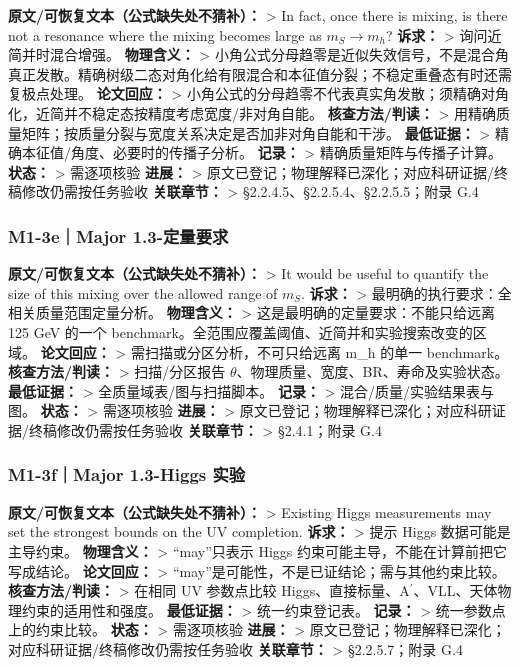 \documentclass[
  chinese,
  UTF8]{ctexart}
\begin{document}
\textbf{原文/可恢复文本（公式缺失处不猜补）：} \textgreater{} In fact,
once there is mixing, is there not a resonance where the mixing becomes
large as \(m_S\to m_h\)? \textbf{诉求：} \textgreater{}
询问近简并时混合增强。 \textbf{物理含义：} \textgreater{}
小角公式分母趋零是近似失效信号，不是混合角真正发散。精确树级二态对角化给有限混合和本征值分裂；不稳定重叠态有时还需复极点处理。
\textbf{论文回应：} \textgreater{}
小角公式的分母趋零不代表真实角发散；须精确对角化，近简并不稳定态按精度考虑宽度/非对角自能。
\textbf{核查方法/判读：} \textgreater{}
用精确质量矩阵；按质量分裂与宽度关系决定是否加非对角自能和干涉。
\textbf{最低证据：} \textgreater{} 精确本征值/角度、必要时的传播子分析。
\textbf{记录：} \textgreater{} 精确质量矩阵与传播子计算。
\textbf{状态：} \textgreater{} 需逐项核验 \textbf{进展：} \textgreater{}
原文已登记；物理解释已深化；对应科研证据/终稿修改仍需按任务验收
\textbf{关联章节：} \textgreater{} §2.2.4.5、§2.2.5.4、§2.2.5.5；附录
G.4

\subsubsection{M1-3e｜Major
1.3-定量要求}\label{m1-3emajor-1.3-ux5b9aux91cfux8981ux6c42}

\textbf{原文/可恢复文本（公式缺失处不猜补）：} \textgreater{} It would
be useful to quantify the size of this mixing over the allowed range of
\(m_S\). \textbf{诉求：} \textgreater{}
最明确的执行要求：全相关质量范围定量分析。 \textbf{物理含义：}
\textgreater{} 这是最明确的定量要求：不能只给远离 125 GeV 的一个
benchmark。全范围应覆盖阈值、近简并和实验搜索改变的区域。
\textbf{论文回应：} \textgreater{} 需扫描或分区分析，不可只给远离 m\_h
的单一 benchmark。 \textbf{核查方法/判读：} \textgreater{} 扫描/分区报告
\ensuremath{\theta}、物理质量、宽度、BR、寿命及实验状态。
\textbf{最低证据：} \textgreater{} 全质量域表/图与扫描脚本。
\textbf{记录：} \textgreater{} 混合/质量/实验结果表与图。
\textbf{状态：} \textgreater{} 需逐项核验 \textbf{进展：} \textgreater{}
原文已登记；物理解释已深化；对应科研证据/终稿修改仍需按任务验收
\textbf{关联章节：} \textgreater{} §2.4.1；附录 G.4

\subsubsection{M1-3f｜Major 1.3-Higgs
实验}\label{m1-3fmajor-1.3-higgs-ux5b9eux9a8c}

\textbf{原文/可恢复文本（公式缺失处不猜补）：} \textgreater{} Existing
Higgs measurements may set the strongest bounds on the UV completion.
\textbf{诉求：} \textgreater{} 提示 Higgs 数据可能是主导约束。
\textbf{物理含义：} \textgreater{} ``may''只表示 Higgs
约束可能主导，不能在计算前把它写成结论。 \textbf{论文回应：}
\textgreater{} ``may''是可能性，不是已证结论；需与其他约束比较。
\textbf{核查方法/判读：} \textgreater{} 在相同 UV 参数点比较
Higgs、直接标量、A\ensuremath{^\prime}、VLL、天体物理约束的适用性和强度。
\textbf{最低证据：} \textgreater{} 统一约束登记表。 \textbf{记录：}
\textgreater{} 统一参数点上的约束比较。 \textbf{状态：} \textgreater{}
需逐项核验 \textbf{进展：} \textgreater{}
原文已登记；物理解释已深化；对应科研证据/终稿修改仍需按任务验收
\textbf{关联章节：} \textgreater{} §2.2.5.7；附录 G.4
\end{document}
